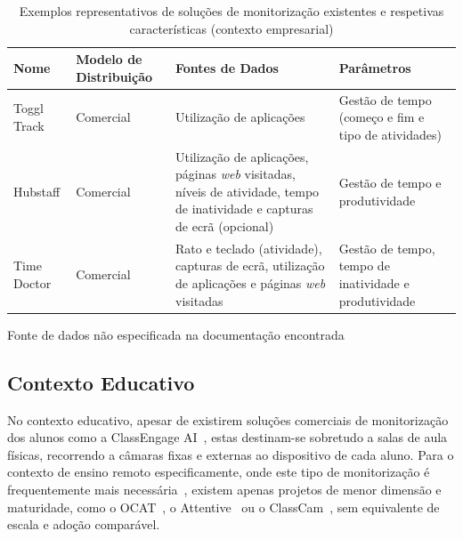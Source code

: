 \begin{table}[h]
    \centering
    \begin{threeparttable}
        \caption{Exemplos representativos de soluções de monitorização existentes e respetivas características (contexto empresarial)}
        \label{tab:alternatives_summary_job}
        \begin{tabularx}{\linewidth}{l l X X}
            \toprule
            \textbf{Nome} & \textbf{Modelo de Distribuição} & \textbf{Fontes de Dados} & \textbf{Parâmetros} \\
            \midrule
            Toggl Track & Comercial & Utilização de aplicações & Gestão de tempo (começo e fim e tipo de atividades) \\
            Hubstaff & Comercial &  Utilização de aplicações, páginas \textit{web} visitadas, níveis de atividade\tnote{1}, tempo de inatividade\tnote{1} e capturas de ecrã (opcional) & Gestão de tempo e produtividade \\
            Time Doctor & Comercial & Rato e teclado (atividade), capturas de ecrã, utilização de aplicações e páginas \textit{web} visitadas & Gestão de tempo, tempo de inatividade e produtividade \\
            \bottomrule
        \end{tabularx}
        \begin{tablenotes}
            \small
            \item[1] Fonte de dados não especificada na documentação encontrada
        \end{tablenotes}
    \end{threeparttable}
\end{table}

\subsection{Contexto Educativo}

No contexto educativo, apesar de existirem soluções comerciais de monitorização dos alunos como a ClassEngage AI~\cite{classengage}, estas destinam-se sobretudo a salas de aula físicas, recorrendo a câmaras fixas e externas ao dispositivo de cada aluno. Para o contexto de ensino remoto especificamente, onde este tipo de monitorização é frequentemente mais necessária~\cite{online_classes_sharma}, existem apenas projetos de menor dimensão e maturidade, como o \ac{OCAT}~\cite{ocat}, o Attentive~\cite{attentive} ou o ClassCam~\cite{classcam}, sem equivalente de escala e adoção comparável.

